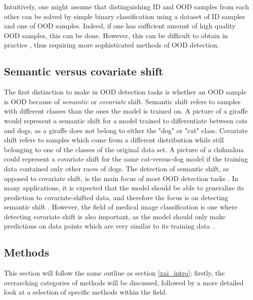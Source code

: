 \documentclass[conference]{IEEEtran}
\begin{document}
Intuitively, one might assume that distinguishing ID and OOD samples from each other can be solved by simple binary classification using a dataset of ID samples and one of OOD samples. Indeed, if one has sufficient amount of high quality OOD samples, this can be done. However, this can be difficult to obtain in practice \cite[15]{oodoverview}, thus requiring more sophisticated methods of OOD detection.

\subsection{Semantic versus covariate shift}

The first distinction to make in OOD detection tasks is whether an OOD sample is OOD because of {\it semantic} or {\it covariate} shift. Semantic shift refers to samples with different classes than the ones the model is trained on. A picture of a giraffe would represent a semantic shift for a model trained to differentiate between cats and dogs, as a giraffe does not belong to either the "dog" or "cat" class. Covariate shift refers to samples which come from a different distribution while still belonging to one of the classes of the original data set. A picture of a chihuahua could represent a covariate shift for the same cat-versus-dog model if the training data contained only other races of dogs. The detection of semantic shift, as opposed to covariate shift, is the main focus of most OOD detection tasks \cite[5]{oodoverview}. In many applications, it is expected that the model should be able to generalize its prediction to covariate-shifted data, and therefore the focus is on detecting semantic shift \cite[5]{oodoverview}. However, the field of medical image classification is one where detecting covariate shift is also important, as the model should only make predictions on data points which are very similar to its training data \cite[5]{oodoverview}.


\subsection{Methods}

This section will follow the same outline as section \ref{xai_intro}; firstly, the overarching categories of methods will be discussed, followed by a more detailed look at a selection of specific methods within the field.
\\
\end{document}
